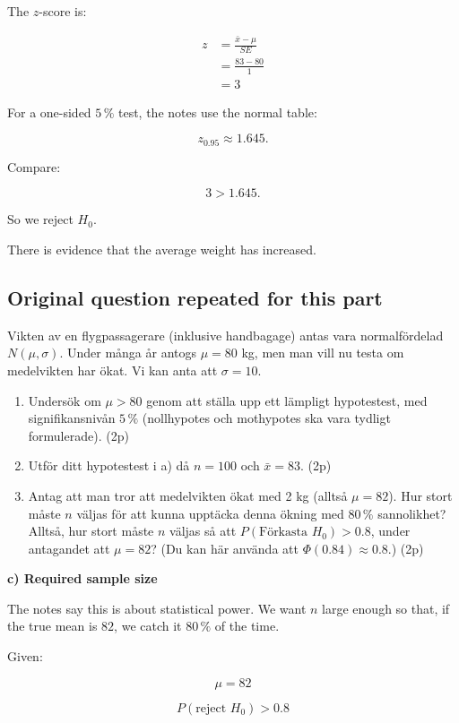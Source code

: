\documentclass[10pt]{article}
\begin{document}
The $z$-score is:

\begin{align*}
z
&=
\frac{\bar{x}-\mu}{SE} \\[2mm]
&=
\frac{83-80}{1} \\[2mm]
&=3
\end{align*}

For a one-sided $5\,\%$ test, the notes use the normal table:

\[
z_{0.95}\approx 1.645.
\]

Compare:

\[
3>1.645.
\]

So we reject $H_0$.

There is evidence that the average weight has increased.

\subsection*{Original question repeated for this part}
Vikten av en flygpassagerare (inklusive handbagage) antas vara
normalfördelad $N(\mu,\sigma)$. Under många år antogs $\mu=80$ kg,
men man vill nu testa om medelvikten har ökat.
Vi kan anta att $\sigma=10$.

\begin{enumerate}[label=\alph*)]
\item
Undersök om $\mu>80$ genom att ställa upp ett lämpligt hypotestest,
med signifikansnivån $5\,\%$ (nollhypotes och mothypotes ska vara
tydligt formulerade).
\hfill (2p)

\item
Utför ditt hypotestest i a) då $n=100$ och $\bar{x}=83$.
\hfill (2p)

\item
Antag att man tror att medelvikten ökat med 2 kg
(alltså $\mu=82$). Hur stort måste $n$ väljas för att kunna
upptäcka denna ökning med $80\,\%$ sannolikhet?
Alltså, hur stort måste $n$ väljas så att
$P(\text{Förkasta }H_0)>0.8$, under antagandet att $\mu=82$?
(Du kan här använda att $\Phi(0.84)\approx 0.8$.)
\hfill (2p)
\end{enumerate}

\textbf{c) Required sample size}

The notes say this is about statistical power.
We want $n$ large enough so that, if the true mean is $82$,
we catch it $80\,\%$ of the time.

Given:

\[
\mu=82
\]

\[
P(\text{reject }H_0)>0.8
\]
\end{document}
